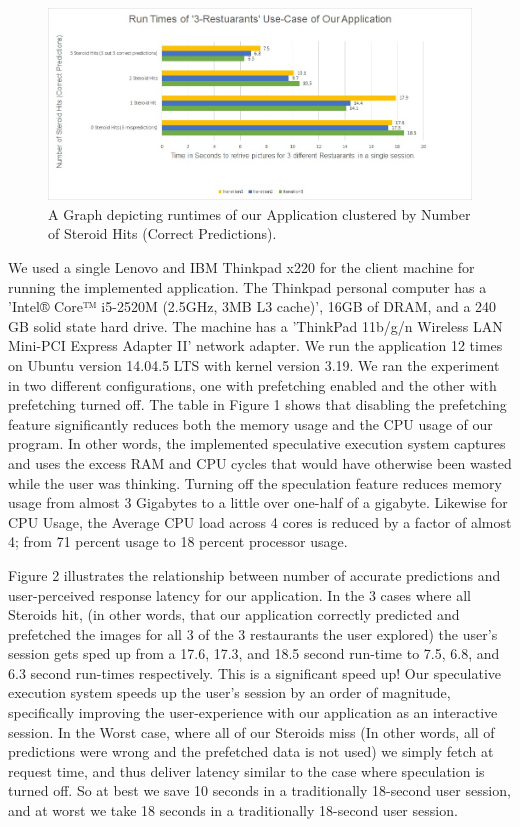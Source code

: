 \begin{figure}
  \includegraphics[width=\linewidth]{figs/runTimeChart1.jpg}
  \caption{A Graph depicting runtimes of our Application clustered by Number of Steroid Hits (Correct Predictions).}
  \label{fig:graph1}
\end{figure}

We used a single Lenovo and IBM Thinkpad x220 for the client machine for running the implemented application. The Thinkpad personal computer has a 'Intel® Core™ i5-2520M (2.5GHz, 3MB L3 cache)', 16GB of DRAM, and a 240 GB solid state hard drive. The machine has a 'ThinkPad 11b/g/n Wireless LAN Mini-PCI Express Adapter II' network adapter. We run the application 12 times on Ubuntu version 14.04.5 LTS with kernel version 3.19. We ran the experiment in two different configurations, one with prefetching enabled and the other with prefetching turned off. The table in Figure 1 shows that disabling the prefetching feature significantly reduces both the memory usage and the CPU usage of our program. In other words, the implemented speculative execution system captures and uses the excess RAM and CPU cycles that would have otherwise been wasted while the user was thinking. Turning off the speculation feature reduces memory usage from almost 3 Gigabytes to a little over one-half of a gigabyte. Likewise for CPU Usage, the Average CPU load across 4 cores is reduced by a factor of almost 4; from 71 percent usage to 18 percent processor usage.

Figure 2 illustrates the relationship between number of accurate predictions and user-perceived response latency for our application. In the 3 cases where all Steroids hit, (in other words, that our application correctly predicted and prefetched the images for all 3 of the 3 restaurants the user explored) the user's session gets sped up from a 17.6, 17.3, and 18.5 second run-time to 7.5, 6.8, and 6.3 second run-times respectively. This is a significant speed up! Our speculative execution system speeds up the user's session by an order of magnitude, specifically improving the user-experience with our application as an interactive session. In the Worst case, where all of our Steroids miss (In other words, all of predictions were wrong and the prefetched data is not used) we simply fetch at request time, and thus deliver latency similar to the case where speculation is turned off. So at best we save 10 seconds in a traditionally 18-second user session, and at worst we take 18 seconds in a traditionally 18-second user session. 
